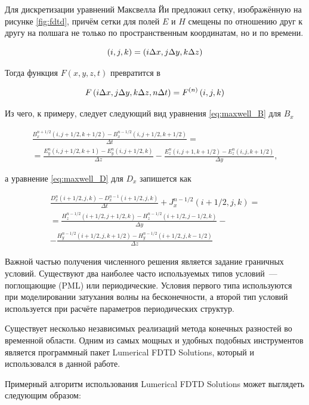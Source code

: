Для дискретизации уравнений Максвелла Йи предложил сетку, изображённую на рисунке \ref{fig:fdtd}, причём сетки для полей $E$ и $H$ смещены по отношению друг к другу на полшага не только по пространственным координатам, но и по времени.

\begin{equation}
  \left( i, j, k \right) = \left( i\Delta x, j\Delta y, k\Delta z \right)
\end{equation}

Тогда функция $F(x, y, z, t)$ превратится в

\begin{equation}
  F\left( i\Delta x, j\Delta y, k\Delta z, n\Delta t \right) = F^{(n)}\left( i,j,k \right) 
\end{equation}

Из чего, к примеру, следует следующий вид уравнения \ref{eq:maxwell_B} для $B_x$

\begin{multline}
	\frac{B_x^{n+1/2}(i,j+1/2,k+1/2)-B_x^{n-1/2}(i,j+1/2,k+1/2)}{\Delta t} = \\
	= \frac{E_y^n(i, j+1/2,k+1) - E_y^n(i, j+1/2,k)}{\Delta z} - \frac{E_z^n(i, j+1,k+1/2) - E_z^n(i,j,k+1/2)}{\Delta y},
\end{multline}

а уравнение \ref{eq:maxwell_D} для $D_x$ запишется как

\begin{multline}
	\frac{D_x^n(i+1/2,j,k) - D_x^{n-1}(i+1/2,j,k)}{\Delta t} + J_x^{n-1/2}(i+1/2,j,k)= \\
	= \frac{H_z^{n-1/2}(i+1/2,j+1/2,k) - H_z^{n-1/2}(i+1/2,j-1/2,k)}{\Delta y} - \\
	- \frac{H_y^{n-1/2}(i+1/2,j,k+1/2) - H_y^{n-1/2}(i+1/2,j,k-1/2)}{\Delta z}
\end{multline}

Важной частью получения численного решения является задание граничных условий. Существуют два наиболее часто используемых типов условий~--- поглощающие (PML) или периодические. Условия первого типа используются при моделировании затухания волны на бесконечности, а второй тип условий используется при расчёте параметров периодических структур.

Существует несколько независимых реализаций метода конечных разностей во временной области. Одним из самых мощных и удобных подобных инструментов является программный пакет Lumerical FDTD Solutions, который и использовался в данной работе.

Примерный алгоритм использования Lumerical FDTD Solutions может выглядеть следующим образом:

